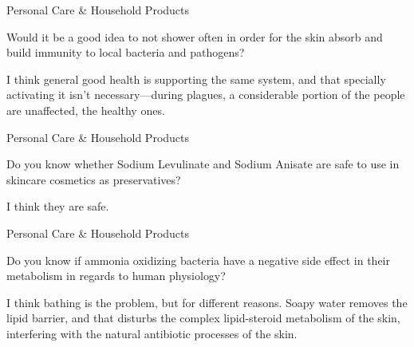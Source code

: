 \documentclass[11pt,oneside,openany,extrafontsizes]{memoir}
\begin{document}
\begin{qaexchange}{Personal Care \& Household Products}

    \begin{question}
        Would it be a good idea to not shower often in order for the skin absorb and build immunity to local bacteria and pathogens?
    \end{question}

    \begin{answer}
      I think general good health is supporting the same system, and that specially activating it isn't necessary---during plagues, a considerable portion of the people are unaffected, the healthy ones.
    \end{answer}
\end{qaexchange}

\begin{qaexchange}{Personal Care \& Household Products}

    \begin{question}
        Do you know whether Sodium Levulinate and Sodium Anisate are safe to use in skincare cosmetics as preservatives?
    \end{question}

    \begin{answer}
       I think they are safe.
    \end{answer}
\end{qaexchange}

\begin{qaexchange}{Personal Care \& Household Products}

    \begin{question}
         Do you know if ammonia oxidizing bacteria have a negative side effect in their metabolism in regards to human physiology?
    \end{question}

    \begin{answer}
      I think bathing is the problem, but for different reasons. Soapy water removes the lipid barrier, and that disturbs the complex lipid-steroid metabolism of the skin, interfering with the natural antibiotic processes of the skin.
    \end{answer}
\end{qaexchange}
\end{document}
